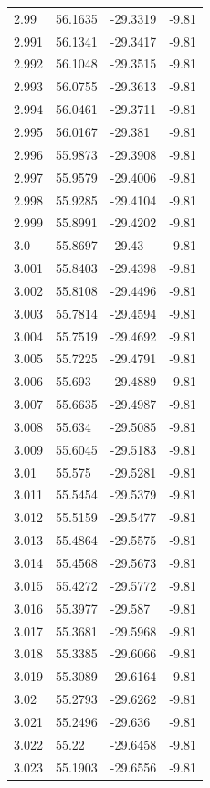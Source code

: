 \begin{tabular}{llll}
2.99 & 56.1635 & -29.3319 & -9.81 \\
2.991 & 56.1341 & -29.3417 & -9.81 \\
2.992 & 56.1048 & -29.3515 & -9.81 \\
2.993 & 56.0755 & -29.3613 & -9.81 \\
2.994 & 56.0461 & -29.3711 & -9.81 \\
2.995 & 56.0167 & -29.381 & -9.81 \\
2.996 & 55.9873 & -29.3908 & -9.81 \\
2.997 & 55.9579 & -29.4006 & -9.81 \\
2.998 & 55.9285 & -29.4104 & -9.81 \\
2.999 & 55.8991 & -29.4202 & -9.81 \\
3.0 & 55.8697 & -29.43 & -9.81 \\
3.001 & 55.8403 & -29.4398 & -9.81 \\
3.002 & 55.8108 & -29.4496 & -9.81 \\
3.003 & 55.7814 & -29.4594 & -9.81 \\
3.004 & 55.7519 & -29.4692 & -9.81 \\
3.005 & 55.7225 & -29.4791 & -9.81 \\
3.006 & 55.693 & -29.4889 & -9.81 \\
3.007 & 55.6635 & -29.4987 & -9.81 \\
3.008 & 55.634 & -29.5085 & -9.81 \\
3.009 & 55.6045 & -29.5183 & -9.81 \\
3.01 & 55.575 & -29.5281 & -9.81 \\
3.011 & 55.5454 & -29.5379 & -9.81 \\
3.012 & 55.5159 & -29.5477 & -9.81 \\
3.013 & 55.4864 & -29.5575 & -9.81 \\
3.014 & 55.4568 & -29.5673 & -9.81 \\
3.015 & 55.4272 & -29.5772 & -9.81 \\
3.016 & 55.3977 & -29.587 & -9.81 \\
3.017 & 55.3681 & -29.5968 & -9.81 \\
3.018 & 55.3385 & -29.6066 & -9.81 \\
3.019 & 55.3089 & -29.6164 & -9.81 \\
3.02 & 55.2793 & -29.6262 & -9.81 \\
3.021 & 55.2496 & -29.636 & -9.81 \\
3.022 & 55.22 & -29.6458 & -9.81 \\
3.023 & 55.1903 & -29.6556 & -9.81 \\

\end{tabular}

